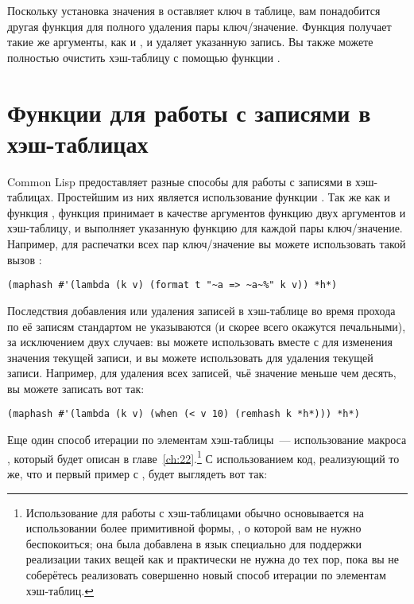 Поскольку установка значения в  оставляет ключ в таблице, вам понадобится другая
функция для полного удаления пары ключ/значение.  Функция  получает такие же
аргументы, как и , и удаляет указанную запись.  Вы также можете полностью
очистить хэш-таблицу с помощью функции .


\section{Функции для работы с записями в хэш-таблицах}

Common Lisp предоставляет разные способы для работы с записями в хэш-таблицах.  Простейшим
из них является использование функции .  Так же как и функция ,
функция  принимает в качестве аргументов функцию двух аргументов и
хэш-таблицу, и выполняет указанную функцию для каждой пары ключ/значение.  Например, для
распечатки всех пар ключ/значение вы можете использовать такой вызов :

\begin{lstlisting}[style=lisprepl]
  (maphash #'(lambda (k v) (format t "~a => ~a~%" k v)) *h*)
\end{lstlisting}

Последствия добавления или удаления записей в хэш-таблице во время прохода по её записям
стандартом не указываются (и скорее всего окажутся печальными), за исключением двух
случаев: вы можете использовать  вместе с  для изменения значения
текущей записи, и вы можете использовать  для удаления текущей записи.
Например, для удаления всех записей, чьё значение меньше чем десять, вы можете записать
вот так:

\begin{lstlisting}[style=lisprepl]
  (maphash #'(lambda (k v) (when (< v 10) (remhash k *h*))) *h*)
\end{lstlisting}

Еще один способ итерации по элементам хэш-таблицы~--- использование макроса
, который будет описан в главе~\ref{ch:22}.\footnote{Использование  для
  работы с хэш-таблицами обычно основывается на использовании более примитивной формы,
  , о которой вам не нужно беспокоиться; она была добавлена
  в язык специально для поддержки реализации таких вещей как  и практически не
  нужна до тех пор, пока вы не соберётесь реализовать совершенно новый способ итерации по
  элементам хэш-таблиц.}  С использованием  код, реализующий то же, что и первый
пример с , будет выглядеть вот так:

